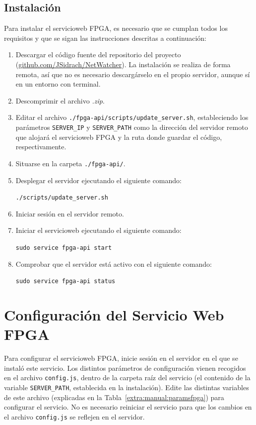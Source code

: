 \subsection*{Instalación}
Para instalar el \gls{servicioweb} \gls{FPGA}, es necesario que se cumplan todos los requisitos y que se sigan las instrucciones descritas a continuación:
\begin{enumerate}
  \item Descargar el código fuente del repositorio del proyecto (\href{https://github.com/JSidrach/NetWatcher/archive/master.zip}{\footnotesize{github.com/JSidrach/NetWatcher}}).
  La instalación se realiza de forma remota, así que no es necesario descargárselo en el propio servidor, aunque sí en un entorno con terminal.
  \item Descomprimir el archivo \textit{.zip}.
  \item Editar el archivo \texttt{./fpga-api/scripts/update\_server.sh}, estableciendo los parámetros \texttt{SERVER\_IP} y \texttt{SERVER\_PATH} como la dirección del servidor remoto que alojará el \gls{servicioweb} \gls{FPGA} y la ruta donde guardar el código, respectivamente.
  \item Situarse en la carpeta \texttt{./fpga-api/}.
  \item Desplegar el servidor ejecutando el siguiente comando:

  \texttt{./scripts/update\_server.sh}
  \item Iniciar sesión en el servidor remoto.
  \item Iniciar el \gls{servicioweb} ejecutando el siguiente comando:

  \texttt{sudo service fpga-api start}
  \item Comprobar que el servidor está activo con el siguiente comando:

  \texttt{sudo service fpga-api status}
\end{enumerate}


\section{Configuración del Servicio Web FPGA\label{extra:manual:configfpga}}
Para configurar el \gls{servicioweb} \gls{FPGA}, inicie sesión en el servidor en el que se instaló este servicio.
Los distintos parámetros de configuración vienen recogidos en el archivo \texttt{config.js}, dentro de la carpeta raíz del servicio (el contenido de la variable \texttt{SERVER\_PATH}, establecida en la instalación).
Edite las distintas variables de este archivo (explicadas en la Tabla~\ref{extra:manual:paramsfpga}) para configurar el servicio.
No es necesario reiniciar el servicio para que los cambios en el archivo \texttt{config.js} se reflejen en el servidor.


